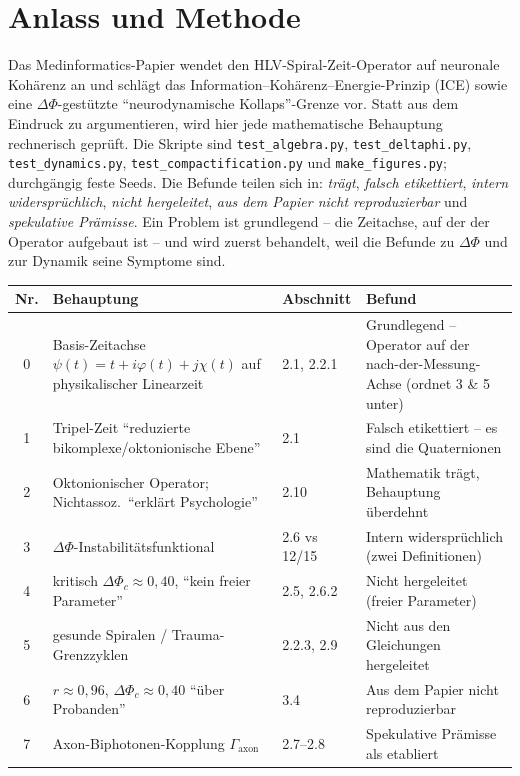 \section{Anlass und Methode}
Das Medinformatics-Papier wendet den HLV-Spiral-Zeit-Operator auf neuronale Kohärenz an
und schlägt das Information--Kohärenz--Energie-Prinzip (ICE) sowie eine
$\Delta\Phi$-gestützte ``neurodynamische Kollaps''-Grenze vor. Statt aus dem Eindruck zu
argumentieren, wird hier jede mathematische Behauptung rechnerisch geprüft. Die Skripte
sind \texttt{test\_algebra.py}, \texttt{test\_deltaphi.py}, \texttt{test\_dynamics.py},
\texttt{test\_compactification.py} und \texttt{make\_figures.py}; durchgängig feste Seeds.
Die Befunde teilen sich in: \emph{trägt}, \emph{falsch etikettiert}, \emph{intern
widersprüchlich}, \emph{nicht hergeleitet}, \emph{aus dem Papier nicht reproduzierbar}
und \emph{spekulative Prämisse}. Ein Problem ist grundlegend -- die Zeitachse, auf der der
Operator aufgebaut ist -- und wird zuerst behandelt, weil die Befunde zu $\Delta\Phi$ und
zur Dynamik seine Symptome sind.

\begin{center}\small
\renewcommand{\arraystretch}{1.25}
\begin{tabular}{@{}c p{4.1cm} p{1.7cm} p{5.0cm}@{}}
\toprule
Nr. & Behauptung & Abschnitt & Befund\\
\midrule
0 & Basis-Zeitachse $\psi(t)=t+i\varphi(t)+j\chi(t)$ auf physikalischer Linearzeit & 2.1, 2.2.1 & Grundlegend -- Operator auf der nach-der-Messung-Achse (ordnet 3 \& 5 unter)\\
1 & Tripel-Zeit ``reduzierte bikomplexe/oktonionische Ebene'' & 2.1 & Falsch etikettiert -- es sind die Quaternionen\\
2 & Oktonionischer Operator; Nichtassoz.\ ``erklärt Psychologie'' & 2.10 & Mathematik trägt, Behauptung überdehnt\\
3 & $\Delta\Phi$-Instabilitätsfunktional & 2.6 vs 12/15 & Intern widersprüchlich (zwei Definitionen)\\
4 & kritisch $\Delta\Phi_c\approx0{,}40$, ``kein freier Parameter'' & 2.5, 2.6.2 & Nicht hergeleitet (freier Parameter)\\
5 & gesunde Spiralen / Trauma-Grenzzyklen & 2.2.3, 2.9 & Nicht aus den Gleichungen hergeleitet\\
6 & $r\approx0{,}96$, $\Delta\Phi_c\approx0{,}40$ ``über Probanden'' & 3.4 & Aus dem Papier nicht reproduzierbar\\
7 & Axon-Biphotonen-Kopplung $\Gamma_{\text{axon}}$ & 2.7--2.8 & Spekulative Prämisse als etabliert\\
\bottomrule
\end{tabular}
\end{center}

